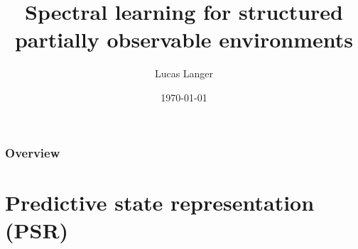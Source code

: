 \documentclass{beamer}
\title[Spectral learning with structure]{Spectral learning for structured partially observable environments} %
\author{Lucas Langer} %
\institute[McGill University] %
{
Supervisors: Borja Balle, Doina Precup \\
\medskip
}
\date{\today} %
\begin{document}
\begin{frame}
\titlepage %
\end{frame}

\begin{frame}
\frametitle{Overview} %
\tableofcontents %
\end{frame}


\section{Predictive state representation (PSR)} %



\end{document}
